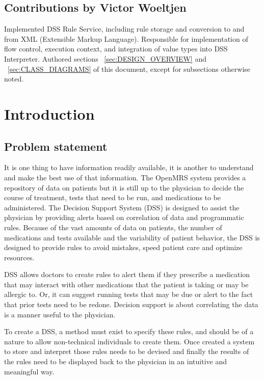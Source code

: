 \documentclass[12pt,letterpaper]{article}
\begin{document}
\subsection{Contributions by Victor Woeltjen}

Implemented DSS Rule Service, including rule storage and conversion to and from XML (Extensible Markup Language). Responsible for implementation of flow control, execution 
context, and integration of value types into DSS Interpreter. Authored sections 
~\ref{sec:DESIGN_OVERVIEW} and
~\ref{sec:CLASS_DIAGRAMS} of this document, except for subsections otherwise noted.


\newpage 
\section{Introduction}

\subsection{Problem statement}

It is one thing to have information readily available, it is another to understand and make the best use of that information.  The OpenMRS system provides a repository of data on patients but it is still up to the physician to decide the course of treatment, tests that need to be run, and medications to be administered.  The Decision Support System (DSS) is designed to assist the physician by providing alerts based on correlation of data and programmatic rules.  Because of the vast amounts of data on patients, the number of medications and tests available and the variability of patient behavior, the DSS is designed to provide rules to avoid mistakes, speed patient care and optimize resources.

DSS allows doctors to create rules to alert them if they prescribe a medication that may interact with other medications that the patient is taking or may be allergic to.   Or, it can suggest running tests that may be due or alert to the fact that prior tests need to be redone.  Decision support is about correlating the data is a manner useful to the physician.

To create a DSS, a method must exist to specify these rules, and should be of a nature to allow non-technical individuals to create them.  Once created a system to store and interpret those rules needs to be devised and finally the results of the rules need to be displayed back to the physician in an intuitive and meaningful way.
\end{document}
